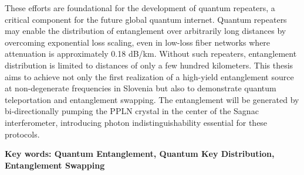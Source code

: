 \documentclass{article}
\theoremstyle{mytheoremstyle}
\theoremstyle{mytheoremstyle}
\theoremstyle{myproblemstyle}
\begin{document}
These efforts are foundational for the development of quantum repeaters, a critical component for the future global quantum internet.
Quantum repeaters may enable the distribution of entanglement over arbitrarily long distances by overcoming exponential loss scaling,
even in low-loss fiber networks where attenuation is approximately 0.18 dB/km. Without such repeaters,
entanglement distribution is limited to distances of only a few hundred kilometers.
This thesis aims to achieve not only the first realization of a high-yield entanglement source at non-degenerate frequencies
in Slovenia but also to demonstrate quantum teleportation and entanglement swapping.
The entanglement will be generated by bi-directionally pumping the PPLN crystal in the center of the Sagnac interferometer,
introducing photon indistinguishability essential for these protocols.
\par\textbf{Key words: Quantum Entanglement, Quantum Key Distribution, Entanglement Swapping}
\end{document}
